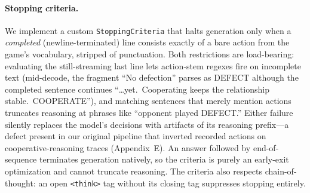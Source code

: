\documentclass[letterpaper]{article} %
\begin{document}
\paragraph{Stopping criteria.} We implement a custom \texttt{StoppingCriteria} that halts generation only when a \emph{completed} (newline-terminated) line consists exactly of a bare action from the game's vocabulary, stripped of punctuation. Both restrictions are load-bearing: evaluating the still-streaming last line lets action-stem regexes fire on incomplete text (mid-decode, the fragment ``No defection'' parses as DEFECT although the completed sentence continues ``\ldots yet.\ Cooperating keeps the relationship stable.\ COOPERATE''), and matching sentences that merely mention actions truncates reasoning at phrases like ``opponent played DEFECT.'' Either failure silently replaces the model's decisions with artifacts of its reasoning prefix---a defect present in our original pipeline that inverted recorded actions on cooperative-reasoning traces (Appendix~E). An answer followed by end-of-sequence terminates generation natively, so the criteria is purely an early-exit optimization and cannot truncate reasoning. The criteria also respects chain-of-thought: an open \texttt{<think>} tag without its closing tag suppresses stopping entirely.
\end{document}
